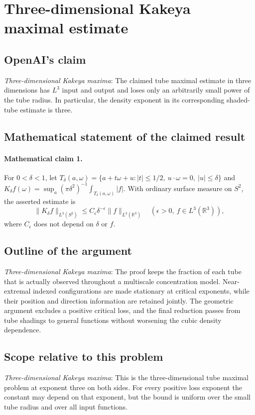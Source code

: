 \documentclass[11pt]{article}
\begin{document}
\section*{Three-dimensional Kakeya maximal estimate}

\subsection{OpenAI's claim}
\textit{Three-dimensional Kakeya maxima}: The claimed tube maximal estimate in three dimensions has $L^3$ input and output and loses only an arbitrarily small power of the tube radius. In particular, the density exponent in its corresponding shaded-tube estimate is three.

\subsection{Mathematical statement of the claimed result}
\paragraph{Mathematical claim 1.} For $0<\delta<1$, let $T_\delta(a,\omega)=\{a+t\omega+u:|t|\le1/2,\ u\cdot\omega=0,\ |u|\le\delta\}$ and $K_\delta f(\omega)=\sup_a(\pi\delta^2)^{-1}\int_{T_\delta(a,\omega)}|f|$. With ordinary surface measure on $S^2$, the asserted estimate is \[\|K_\delta f\|_{L^3(S^2)}\le C_\epsilon\delta^{-\epsilon}\|f\|_{L^3(\mathbb R^3)}\quad(\epsilon>0,\ f\in L^3(\mathbb R^3)),\] where $C_\epsilon$ does not depend on $\delta$ or $f$.

\subsection{Outline of the argument}
\textit{Three-dimensional Kakeya maxima}: The proof keeps the fraction of each tube that is actually observed throughout a multiscale concentration model. Near-extremal indexed configurations are made stationary at critical exponents, while their position and direction information are retained jointly. The geometric argument excludes a positive critical loss, and the final reduction passes from tube shadings to general functions without worsening the cubic density dependence.

\subsection{Scope relative to this problem}
\textit{Three-dimensional Kakeya maxima}: This is the three-dimensional tube maximal problem at exponent three on both sides. For every positive loss exponent the constant may depend on that exponent, but the bound is uniform over the small tube radius and over all input functions.
\end{document}
